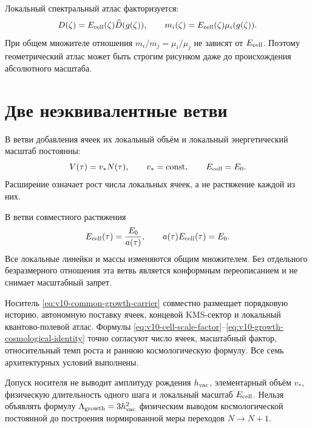 Локальный спектральный атлас факторизуется:
\begin{equation}
 D(\zeta)=E_{\rm cell}(\zeta)\widehat D(g(\zeta)),
 \qquad
 m_i(\zeta)=E_{\rm cell}(\zeta)\mu_i(g(\zeta)).
 \label{eq:v10-local-atlas-factorization}
\end{equation}
При общем множителе отношения $m_i/m_j=\mu_i/\mu_j$ не зависят от
$E_{\rm cell}$. Поэтому геометрический атлас может быть строгим рисунком даже
до происхождения абсолютного масштаба.

\section{Две неэквивалентные ветви}

В ветви добавления ячеек их локальный объём и локальный энергетический
масштаб постоянны:
\begin{equation}
 V(\tau)=v_*N(\tau),
 \qquad v_*=\mathrm{const},
 \qquad E_{\rm cell}=E_0.
 \label{eq:v10-fixed-cell-growth-branch}
\end{equation}
Расширение означает рост числа локальных ячеек, а не растяжение каждой из них.

В ветви совместного растяжения
\begin{equation}
 E_{\rm cell}(\tau)=\frac{E_0}{a(\tau)},
 \qquad
 a(\tau)E_{\rm cell}(\tau)=E_0.
 \label{eq:v10-codilation-branch}
\end{equation}
Все локальные линейки и массы изменяются общим множителем. Без отдельного
безразмерного отношения эта ветвь является конформным переописанием и не
снимает масштабный запрет.

\begin{theorem}
Носитель \eqref{eq:v10-common-growth-carrier} совместно размещает порядковую
историю, автономную поставку ячеек, концевой KMS-сектор и локальный
квантово-полевой атлас. Формулы
\eqref{eq:v10-cell-scale-factor}--\eqref{eq:v10-growth-cosmological-identity}
точно согласуют число ячеек, масштабный фактор, относительный темп роста и
раннюю космологическую формулу. Все семь архитектурных условий выполнены.
\end{theorem}

\begin{nogocriterion}
Допуск носителя не выводит амплитуду рождения $h_{\rm vac}$, элементарный
объём $v_*$, физическую длительность одного шага и локальный масштаб
$E_{\rm cell}$. Нельзя объявлять формулу
$\Lambda_{\rm growth}=3h_{\rm vac}^2$ физическим выводом космологической
постоянной до построения нормированной меры переходов $N\to N+1$.
\end{nogocriterion}

